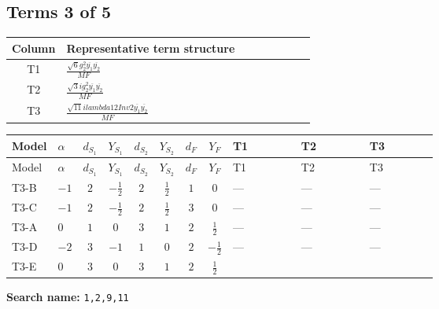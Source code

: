 \documentclass[8pt]{article}
\begin{document}
\begin{landscape}
\subsection*{Terms 3 of 5}
\begin{center}
\begin{tabular}{@{}c >{\raggedright\arraybackslash}p{0.82\linewidth}@{}}
\toprule
Column & Representative term structure \\
\midrule
T1 & \(\displaystyle \frac{\sqrt{6} g_{2}^{2} \overline{y_{1}} \overline{y_{2}}}{MF}\) \\
\midrule
T2 & \(\displaystyle \frac{\sqrt{3} i g_{2}^{2} \overline{y_{1}} \overline{y_{2}}}{MF}\) \\
\midrule
T3 & \(\displaystyle \frac{\sqrt{11} i lambda12Inv2 \overline{y_{1}} \overline{y_{2}}}{MF}\) \\
\midrule
\bottomrule
\end{tabular}
\end{center}
\smallskip
\tiny
\begin{longtable}{@{}llcccccc >{\raggedright\arraybackslash}p{0.21\linewidth} >{\raggedright\arraybackslash}p{0.21\linewidth} >{\raggedright\arraybackslash}p{0.21\linewidth}@{}}
\toprule
Model & $\alpha$ & $d_{S_1}$ & $Y_{S_1}$ & $d_{S_2}$ & $Y_{S_2}$ & $d_F$ & $Y_F$ & T1 & T2 & T3 \\
\midrule
\endfirsthead
\toprule
Model & $\alpha$ & $d_{S_1}$ & $Y_{S_1}$ & $d_{S_2}$ & $Y_{S_2}$ & $d_F$ & $Y_F$ & T1 & T2 & T3 \\
\midrule
\endhead
T3-B & $-1$ & $2$ & $-\frac{1}{2}$ & $2$ & $\frac{1}{2}$ & $1$ & $0$ & --- & --- & --- \\
\midrule
T3-C & $-1$ & $2$ & $-\frac{1}{2}$ & $2$ & $\frac{1}{2}$ & $3$ & $0$ & --- & --- & --- \\
\midrule
T3-A & $0$ & $1$ & $0$ & $3$ & $1$ & $2$ & $\frac{1}{2}$ & --- & --- & --- \\
\midrule
T3-D & $-2$ & $3$ & $-1$ & $1$ & $0$ & $2$ & $-\frac{1}{2}$ & --- & --- & --- \\
\midrule
T3-E & $0$ & $3$ & $0$ & $3$ & $1$ & $2$ & $\frac{1}{2}$ & \scriptsize\adjustbox{max width=\linewidth}{$\begin{gathered} - \frac{\sqrt{6} g_{2}^{2} \overline{y_{1}} \overline{y_{2}}}{6 MF}\end{gathered}$} & \scriptsize\adjustbox{max width=\linewidth}{$\begin{gathered} - \frac{15 \sqrt{3} i g_{2}^{2} \overline{y_{1}} \overline{y_{2}}}{8 MF}\end{gathered}$} & \scriptsize\adjustbox{max width=\linewidth}{$\begin{gathered} - \frac{3 \sqrt{11} i lambda12Inv2 \overline{y_{1}} \overline{y_{2}}}{22 MF}\end{gathered}$} \\
\midrule
\bottomrule
\end{longtable}
\clearpage
\noindent\textbf{Search name: }\texttt{1,2,9,11}\par\smallskip

\end{landscape}
\end{document}
